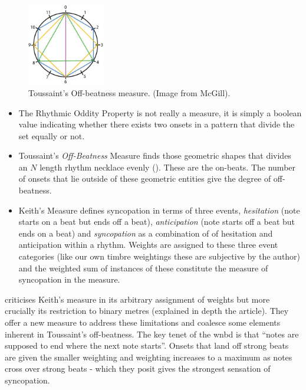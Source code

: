 {{{  \begin{figure}
	\begin{center}
		\includegraphics[width=0.3\textwidth]{ch03_symbolic/figures/offBeatness.jpg}
	\end{center}
	\caption[Toussaint's Off-beatness measure]{Toussaint's Off-beatness measure. (Image from McGill).}
	\label{fig:offbeatness}
	\end{figure}
	
\begin{itemize}
  \item The Rhythmic Oddity Property \citep{arom2004african} is not really a measure, it is simply a boolean value indicating whether there exists two onsets in a pattern that divide the set equally or not.
  \item Toussaint's \textit{Off-Beatness} \citep{Toussaint2004African} Measure finds those geometric shapes that divides an $N$ length rhythm necklace evenly (). These are the on-beats. The number of onsets that lie outside of these geometric entities give the degree of off-beatness.
  \item Keith's Measure \citep{keith1991polychords} defines syncopation in terms of three events, \textit{hesitation} (note starts on a beat but ends off a beat), \textit{anticipation} (note starts off a beat but ends on a beat) and \textit{syncopation} as a combination of of hesitation and anticipation within a rhythm. Weights are assigned to these three event categories (like our own timbre weightings these are subjective by the author) and the weighted sum of instances of these constitute the measure of syncopation in the measure.
\end{itemize}}

\cite{Gomez2005} criticises Keith's measure in its arbitrary assignment of weights but more crucially its restriction to binary metres (explained in depth the article). They offer a new measure to address these limitations and coalesce some elements inherent in Toussaint's off-beatness. The key tenet of the \acrfull{wnbd} is that ``notes are supposed to end where the next note starts''. Onsets that land off strong beats are given the smaller weighting and weighting increases to a maximum as notes cross over strong beats - which they posit gives the strongest sensation of syncopation. 

}}
